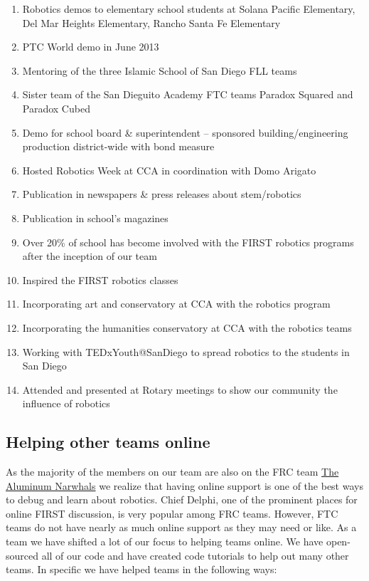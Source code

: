 \begin{enumerate}
\item Robotics demos to elementary school students at Solana Pacific Elementary, Del Mar Heights Elementary, Rancho Santa Fe Elementary
\item PTC World demo in June 2013
\item Mentoring of the three Islamic School of San Diego FLL teams 
\item Sister team of the San Dieguito Academy FTC teams Paradox Squared and Paradox Cubed
\item Demo for school board \& superintendent – sponsored building/engineering production district-wide with bond measure
\item Hosted Robotics Week at CCA in coordination with Domo Arigato
\item Publication in newspapers \& press releases about stem/robotics
\item Publication in school's magazines
\item Over 20\% of school has become involved with the FIRST robotics programs after the inception of our team
\item Inspired the FIRST robotics classes
\item Incorporating art and conservatory at CCA with the robotics program
\item Incorporating the humanities conservatory at CCA with the robotics teams
\item Working with TEDxYouth@SanDiego to spread robotics to the students in San Diego
\item Attended and presented at Rotary meetings to show our community the influence of robotics
\end{enumerate}

\subsection{Helping other teams online}
As the majority of the members on our team are also on the FRC team \underline{The Aluminum Narwhals} we realize that having online support is one of the best ways to debug and learn about robotics. Chief Delphi, one of the prominent places for online FIRST discussion, is very popular among FRC teams. However, FTC teams do not have nearly as much online support as they may need or like. As a team we have shifted a lot of our focus to helping teams online. We have open-sourced all of our code and have created code tutorials to help out many other teams. In specific we have helped teams in the following ways:

